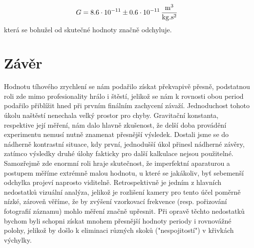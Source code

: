 \documentclass[czech,11pt,a4paper]{article}
\begin{document}
	 \begin{equation}
	 	G = 8.6 \cdot 10^{-11} \pm 0.6 \cdot 10^{-11} \,\rm \frac{m^3}{kg.s^2}
	 \end{equation}
	 která se bohužel od skutečné hodnoty značně odchyluje.
	
	
	
		
	

  
	
	\section{Závěr}
	Hodnotu tíhového zrychlení se nám podařilo získat překvapivě přesně, podstatnou roli zde mimo profesionality hrálo i štěstí, jelikož se nám k rovnosti obou period podařilo přiblížit hned při prvním finálním zachycení závaží. Jednoduchost tohoto úkolu naštěstí nenechala velký prostor pro chyby.
	Gravitační konstanta, respektive její měření, nám dalo hlavně zkušenost, že delší doba provádění experimentu nemusí nutně znamenat přesnější výsledek. Dostali jsme se do nádherně kontrastní situace, kdy první, jednodušší úkol přinesl nádherné závěry, zatímco výsledky druhé úlohy fakticky pro další kalkulace nejsou použitelné. Samozřejmě zde enormní roli hraje skutečnost, že imperfektní aparaturou a postupem měříme extrémně malou hodnotu, u které se jakákoliv, byť sebemenší odchylka projeví naprosto viditelně. Retrospektivně je jedním z hlavních nedostatků vizuální analýza, jelikož je rozlišení kamery pro tento účel poměrně nízké, zároveň věříme, že by zvýšení vzorkovací frekvence (resp. pořizování fotografií záznamu) mohlo měření značně upřesnit. Při opravě těchto nedostatků bychom byli schopni získat mnohem přesnější hodnoty periody i rovnovážné polohy, jelikož by došlo k eliminaci různých skoků ("nespojitostí") v křivkách výchylky.
\end{document}
